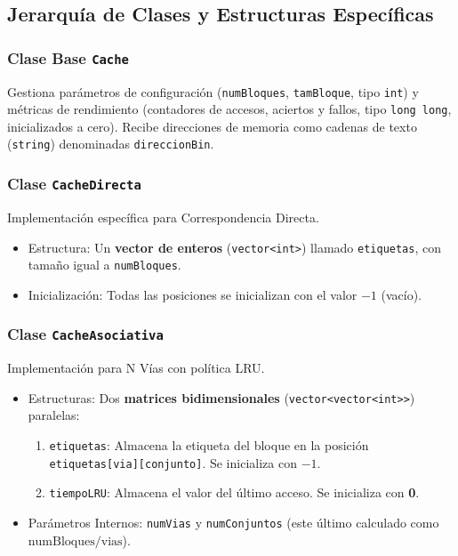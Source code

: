 \documentclass{article}
\begin{document}
\subsection{Jerarquía de Clases y Estructuras Específicas}

\subsubsection{Clase Base \texttt{Cache}}
Gestiona parámetros de configuración (\texttt{numBloques}, \texttt{tamBloque}, tipo \texttt{int}) y métricas de rendimiento (contadores de accesos, aciertos y fallos, tipo \texttt{long long}, inicializados a cero). Recibe direcciones de memoria como cadenas de texto (\texttt{string}) denominadas \texttt{direccionBin}.

\subsubsection{Clase \texttt{CacheDirecta}}
Implementación específica para Correspondencia Directa.
\begin{itemize}
    \item Estructura: Un \textbf{vector de enteros} (\texttt{vector<int>}) llamado \texttt{etiquetas}, con tamaño igual a \texttt{numBloques}.
    \item Inicialización: Todas las posiciones se inicializan con el valor \textbf{$-1$} (vacío).
\end{itemize}

\subsubsection{Clase \texttt{CacheAsociativa}}
Implementación para N Vías con política LRU.
\begin{itemize}
    \item Estructuras: Dos \textbf{matrices bidimensionales} (\texttt{vector<vector<int>>}) paralelas:
    \begin{enumerate}
        \item \texttt{etiquetas}: Almacena la etiqueta del bloque en la posición \texttt{etiquetas[via][conjunto]}. Se inicializa con \textbf{$-1$}.
        \item \texttt{tiempoLRU}: Almacena el valor del último acceso. Se inicializa con \textbf{0}.
    \end{enumerate}
    \item Parámetros Internos: \texttt{numVias} y \texttt{numConjuntos} (este último calculado como $\text{numBloques}/\text{vias}$).
\end{itemize}
\end{document}
